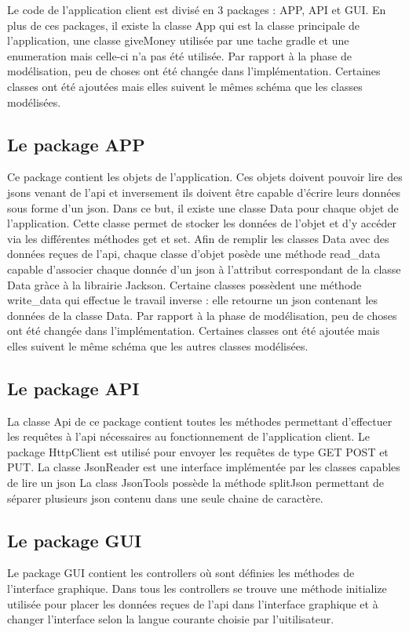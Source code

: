 \documentclass[../rapport.tex]{subfiles}
\begin{document}
Le code de l'application client est divisé en 3 packages : APP, API et GUI.
En plus de ces packages, il existe la classe App qui est la classe principale de l'application, une classe giveMoney utilisée par une tache gradle et une enumeration mais celle-ci n'a pas été utilisée.
Par rapport à la phase de modélisation, peu de choses ont été changée dans l'implémentation. Certaines classes ont été ajoutées mais elles suivent le mêmes schéma que les classes modélisées.

\subsection{Le package APP}
Ce package contient les objets de l'application. Ces objets doivent pouvoir lire des jsons venant de l'api et inversement ils doivent être capable
d'écrire leurs données sous forme d'un json. Dans ce but, il existe une classe Data pour chaque objet de l'application. Cette classe permet de stocker 
les données de l'objet et d'y accéder via les différentes méthodes get et set. 
Afin de remplir les classes Data avec des données reçues de l'api, chaque classe d'objet posède une méthode read\_data capable d'associer
chaque donnée d'un json à l'attribut correspondant de la classe Data gràce à la librairie Jackson.  
Certaine classes possèdent une méthode write\_data qui effectue le travail inverse : elle retourne un json contenant les données de la classe Data.
Par rapport à la phase de modélisation, peu de choses ont été changée dans l'implémentation. Certaines classes ont été ajoutée mais elles suivent le même schéma que 
les autres classes modélisées.

\subsection{Le package API}
La classe Api de ce package contient toutes les méthodes permettant d'effectuer les requêtes à l'api nécessaires au fonctionnement de l'application client.
Le package HttpClient est utilisé pour envoyer les requêtes de type GET POST et PUT.
La classe JsonReader est une interface implémentée par les classes capables de lire un json
La class JsonTools possède la méthode splitJson permettant de séparer plusieurs json contenu dans une seule chaine de caractère.

\subsection{Le package GUI}
Le package GUI contient les controllers où sont définies les méthodes de l'interface graphique. 
Dans tous les controllers se trouve une méthode initialize utilisée pour placer les données reçues de l'api dans l'interface graphique et à changer l'interface
selon la langue courante choisie par l'uitilisateur.
\end{document}
